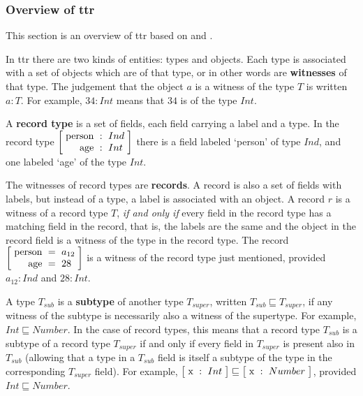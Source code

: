 


\subsubsection{Overview of \gls{ttr}}
\label{sec:ttr}

This section is an overview of \gls{ttr} based on \cite{CooperTypetheorysemantics2012} and \cite{CooperTypetheorylanguage2016}.

In \gls{ttr} there are two kinds of entities: types and objects.
Each type is associated with a set of objects which are of that type, or in other words are \textbf{witnesses} of that type.
The judgement that the object $a$ is a witness of the type $T$ is written $a : T$.
For example, $34 : Int$ means that $34$ is of the type $Int$.

A \textbf{record type} is a set of fields, each field carrying a label and a type.
In the record type $\rec{\text{person} &:& Ind \\ \text{age} &:& Int}$ there is a field labeled `person' of type $Ind$, and one labeled `age' of the type $Int$.

The witnesses of record types are \textbf{records}.
A record is also a set of fields with labels, but instead of a type, a label is associated with an object.
A record $r$ is a witness of a record type $T$, \textit{if and only if} every field in the record type has a matching field in the record, that is, the labels are the same and the object in the record field is a witness of the type in the record type.
The record $\rec{\text{person} &=& a_{12} \\ \text{age} &=& 28}$ is a witness of the record type just mentioned, provided $a_{12} : Ind$ and $28 : Int$.


A type $T_{sub}$ is a \textbf{subtype} of another type $T_{super}$, written $T_{sub} \sqsubseteq T_{super}$, if any witness of the subtype is necessarily also a witness of the supertype.
For example, $Int \sqsubseteq Number$.
In the case of record types, this means that a record type $T_{sub}$ is a subtype of a record type $T_{super}$ if and only if every field in $T_{super}$ is present also in $T_{sub}$ (allowing that a type in a $T_{sub}$ field is itself a subtype of the type in the corresponding $T_{super}$ field).
For example, $\rec{\text{x} &:& Int} \sqsubseteq \rec{\text{x} &:& Number}$, provided $Int \sqsubseteq Number$.

